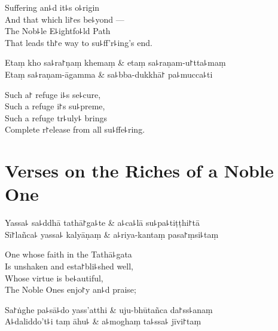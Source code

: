 \begin{english}
  Suffering an꜕d it꜕s o꜕rigin\\
  And that which li꜓es be꜕yond ---\\
  The Nob꜕le E꜕ightfo꜕ld Path\\
  That leads th꜓e way to su꜕ff'r꜕ing's end.
\end{english}

\begin{twochants}
  Etaṃ kho sa꜕ra꜓ṇaṃ khemaṃ & etaṃ sa꜕raṇam-u꜓tta꜕maṃ \\
  Etaṃ sa꜕raṇam-āgamma & sa꜕bba-dukkhā꜓ pa꜕mucca꜕ti \\
\end{twochants}

\begin{english}
  Such a꜓ refuge i꜕s se꜕cure,\\
  Such a refuge i꜓s su꜕preme,\\
  Such a refuge tr꜕uly꜕ brings\\
  Complete r꜓elease from all su꜕ffe꜕ring.
\end{english}

\chapter{Verses on the Riches of a Noble One}%


\begin{leader}
\end{leader}

\begin{twochants}
  Yassa꜕ sa꜕ddhā tathā꜓ga꜕te & a꜕ca꜕lā su꜕pa꜕tiṭṭhi꜓tā \\
  Sī꜓lañca꜕ yassa꜕ kalyāṇaṃ & a꜕riya-kantaṃ pasa꜓ṃsi꜕taṃ \\
\end{twochants}

\begin{english}
  One whose faith in the Tathā꜕gata\\
  Is unshaken and esta꜓bli꜕shed well,\\
  Whose virtue is be꜕autiful,\\
  The Noble Ones enjo꜓y an꜕d praise;
\end{english}

\begin{twochants}
  Sa꜓ṅghe pa꜕sā꜕do yass'atthi & uju-bhūtañca da꜓ss꜕anaṃ \\
  A꜕daliddo't꜕i taṃ āhu꜕ & a꜕moghaṃ ta꜕ssa꜕ jīvi꜓taṃ \\
\end{twochants}

